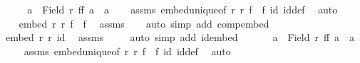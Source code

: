 \begin{isabellebody}
\ \ \isamarkupfalse%
\ \isamarkupfalse%
\ {\isachardoublequoteopen}{\isasymforall}a\ {\isasymin}\ Field\ r{\isachardot}{\kern0pt}\ f{\isacharprime}{\kern0pt}{\isacharparenleft}{\kern0pt}f\ a{\isacharparenright}{\kern0pt}\ {\isacharequal}{\kern0pt}\ a{\isachardoublequoteclose}\isanewline
\ \ \isamarkupfalse%
\ assms\ embed{\isacharunderscore}{\kern0pt}unique{\isacharbrackleft}{\kern0pt}of\ r\ r\ {\isachardoublequoteopen}f{\isacharprime}{\kern0pt}\ {\isasymcirc}\ f{\isachardoublequoteclose}\ id{\isacharbrackright}{\kern0pt}\ id{\isacharunderscore}{\kern0pt}def\ \isamarkupfalse%
\ auto\isanewline
\ \ \isamarkupfalse%
\isanewline
\ \ \isacommand{{\isacharbraceleft}{\kern0pt}}\isamarkupfalse%
\isamarkupfalse%
\ {\isachardoublequoteopen}embed\ r{\isacharprime}{\kern0pt}\ r{\isacharprime}{\kern0pt}\ {\isacharparenleft}{\kern0pt}f\ {\isasymcirc}\ f{\isacharprime}{\kern0pt}{\isacharparenright}{\kern0pt}{\isachardoublequoteclose}\ \isamarkupfalse%
\ assms\isanewline
\ \ \ \isamarkupfalse%
{\isacharparenleft}{\kern0pt}auto\ simp\ add{\isacharcolon}{\kern0pt}\ comp{\isacharunderscore}{\kern0pt}embed{\isacharparenright}{\kern0pt}\isanewline
\ \ \ \isamarkupfalse%
\ \isamarkupfalse%
\ {\isachardoublequoteopen}embed\ r{\isacharprime}{\kern0pt}\ r{\isacharprime}{\kern0pt}\ id{\isachardoublequoteclose}\ \isamarkupfalse%
\ assms\isanewline
\ \ \ \isamarkupfalse%
\ {\isacharparenleft}{\kern0pt}auto\ simp\ add{\isacharcolon}{\kern0pt}\ id{\isacharunderscore}{\kern0pt}embed{\isacharparenright}{\kern0pt}\isanewline
\ \ \ \isamarkupfalse%
\ \isamarkupfalse%
\ {\isachardoublequoteopen}{\isasymforall}a{\isacharprime}{\kern0pt}\ {\isasymin}\ Field\ r{\isacharprime}{\kern0pt}{\isachardot}{\kern0pt}\ f{\isacharparenleft}{\kern0pt}f{\isacharprime}{\kern0pt}\ a{\isacharprime}{\kern0pt}{\isacharparenright}{\kern0pt}\ {\isacharequal}{\kern0pt}\ a{\isacharprime}{\kern0pt}{\isachardoublequoteclose}\isanewline
\ \ \ \isamarkupfalse%
\ assms\ embed{\isacharunderscore}{\kern0pt}unique{\isacharbrackleft}{\kern0pt}of\ r{\isacharprime}{\kern0pt}\ r{\isacharprime}{\kern0pt}\ {\isachardoublequoteopen}f\ {\isasymcirc}\ f{\isacharprime}{\kern0pt}{\isachardoublequoteclose}\ id{\isacharbrackright}{\kern0pt}\ id{\isacharunderscore}{\kern0pt}def\ \isamarkupfalse%
\ auto\isanewline
\ \ \isacommand{{\isacharbraceright}{\kern0pt}}\isamarkupfalse%

\end{isabellebody}
